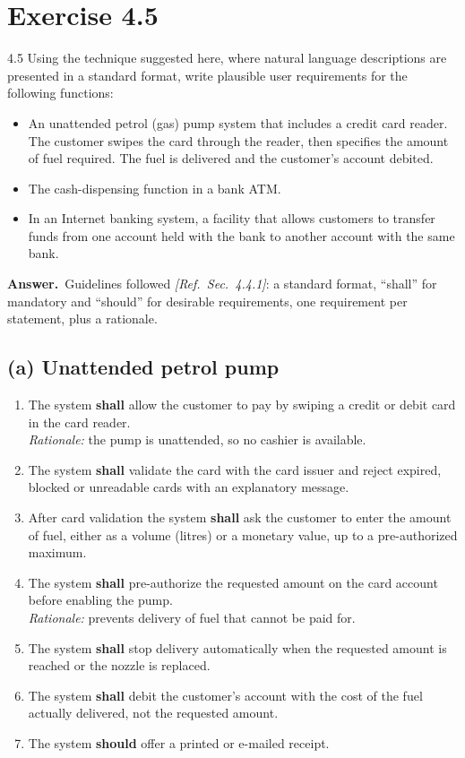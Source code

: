 \documentclass[11pt,a4paper]{article}
\newcommand{\answer}{\par\noindent\textbf{Answer.}\ }
\newcommand{\refsec}[1]{\hfill\textit{\small[Ref.\ Sec.~#1]}}
\begin{document}
\section*{Exercise 4.5}
\begin{question}{4.5}
Using the technique suggested here, where natural language descriptions are presented in a standard
format, write plausible user requirements for the following functions:
\begin{itemize}
  \item An unattended petrol (gas) pump system that includes a credit card reader. The customer swipes the
  card through the reader, then specifies the amount of fuel required. The fuel is delivered and the
  customer's account debited.
  \item The cash-dispensing function in a bank ATM.
  \item In an Internet banking system, a facility that allows customers to transfer funds from one account
  held with the bank to another account with the same bank.
\end{itemize}
\end{question}
\answer Guidelines followed \refsec{4.4.1}: a standard format, ``shall'' for mandatory and ``should''
for desirable requirements, one requirement per statement, plus a rationale.

\subsection*{(a) Unattended petrol pump}
\begin{enumerate}[label=PUMP-\arabic*,leftmargin=*]
  \item The system \textbf{shall} allow the customer to pay by swiping a credit or debit card in the card reader.\\
  \textit{Rationale:} the pump is unattended, so no cashier is available.
  \item The system \textbf{shall} validate the card with the card issuer and reject expired, blocked or unreadable cards with an explanatory message.
  \item After card validation the system \textbf{shall} ask the customer to enter the amount of fuel, either as a volume (litres) or a monetary value, up to a pre-authorized maximum.
  \item The system \textbf{shall} pre-authorize the requested amount on the card account before enabling the pump.\\
  \textit{Rationale:} prevents delivery of fuel that cannot be paid for.
  \item The system \textbf{shall} stop delivery automatically when the requested amount is reached or the nozzle is replaced.
  \item The system \textbf{shall} debit the customer's account with the cost of the fuel actually delivered, not the requested amount.
  \item The system \textbf{should} offer a printed or e-mailed receipt.
\end{enumerate}
\end{document}
